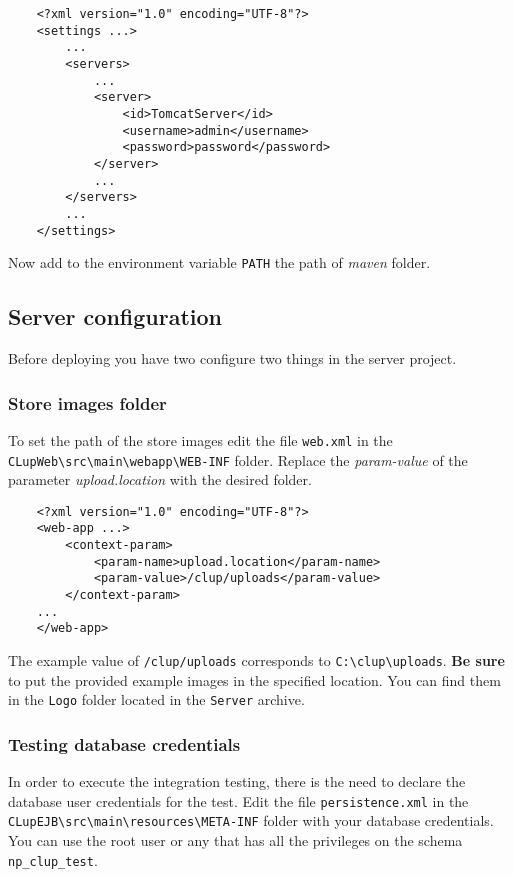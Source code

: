 
\begin{lstlisting}
	<?xml version="1.0" encoding="UTF-8"?>
	<settings ...>
		...
		<servers>
			...
			<server>
				<id>TomcatServer</id>
				<username>admin</username>
				<password>password</password>
			</server>
			...
		</servers>
		...
	</settings>
\end{lstlisting}

Now add to the environment variable \verb|PATH| the path of \textit{maven} folder.

\clearpage

\subsection{Server configuration}
Before deploying you have two configure two things in the server project.

\subsubsection{Store images folder}
To set the path of the store images edit the file \verb|web.xml| in the \verb|CLupWeb\src\main\webapp\WEB-INF| folder.
Replace the \textit{param-value} of the parameter \textit{upload.location} with the desired folder.
\begin{lstlisting}
	<?xml version="1.0" encoding="UTF-8"?>
	<web-app ...>
		<context-param>
			<param-name>upload.location</param-name>
			<param-value>/clup/uploads</param-value>
		</context-param>
	...
	</web-app>
\end{lstlisting}

The example value of \verb|/clup/uploads| corresponds to \verb|C:\clup\uploads|.\newline 
\textbf{Be sure} to put the provided example images in the specified location. You can find them in the \verb|Logo| folder located in the \verb|Server| archive.

\subsubsection{Testing database credentials} 
In order to execute the integration testing, there is the need to declare the database user credentials for the test.\newline 
Edit the file \verb|persistence.xml| in the \verb|CLupEJB\src\main\resources\META-INF| folder with your database credentials.\newline
You can use the root user or any that has all the privileges on the schema \verb|np_clup_test|.

